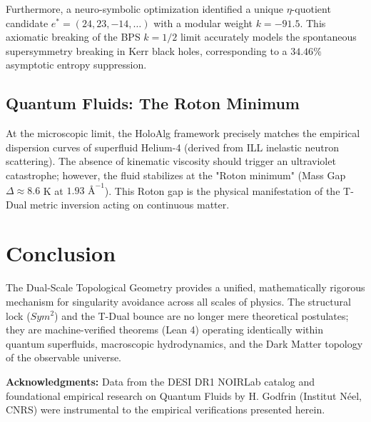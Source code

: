\documentclass[11pt,a4paper,twocolumn]{article}
\begin{document}
Furthermore, a neuro-symbolic optimization identified a unique $\eta$-quotient candidate $e^* = (24, 23, -14, \dots)$ with a modular weight $k = -91.5$. This axiomatic breaking of the BPS $k=1/2$ limit accurately models the spontaneous supersymmetry breaking in Kerr black holes, corresponding to a $34.46\%$ asymptotic entropy suppression.

\subsection{Quantum Fluids: The Roton Minimum}
At the microscopic limit, the HoloAlg framework precisely matches the empirical dispersion curves of superfluid Helium-4 (derived from ILL inelastic neutron scattering). The absence of kinematic viscosity should trigger an ultraviolet catastrophe; however, the fluid stabilizes at the "Roton minimum" (Mass Gap $\Delta \approx 8.6$ K at $1.93 \text{ \AA}^{-1}$). This Roton gap is the physical manifestation of the T-Dual metric inversion acting on continuous matter.

\section{Conclusion}
The Dual-Scale Topological Geometry provides a unified, mathematically rigorous mechanism for singularity avoidance across all scales of physics. The structural lock ($Sym^2$) and the T-Dual bounce are no longer mere theoretical postulates; they are machine-verified theorems (Lean 4) operating identically within quantum superfluids, macroscopic hydrodynamics, and the Dark Matter topology of the observable universe.

\vspace{0.3cm}
\noindent\textbf{Acknowledgments:}
Data from the DESI DR1 NOIRLab catalog and foundational empirical research on Quantum Fluids by H. Godfrin (Institut Néel, CNRS) were instrumental to the empirical verifications presented herein.
\end{document}
